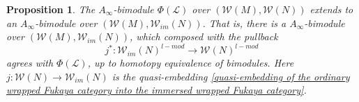 \documentclass{amsart}
\newtheorem{proposition}[theorem]{Proposition}
\numberwithin{equation}{section}
\numberwithin{figure}{section}
\begin{document}
\begin{proposition}\label{extension of the quilted Floer bimodule to Lagrangian immersions}
	The $A_{\infty}$-bimodule $\Phi(\mathcal{L})$ over $(\mathcal{W}(M), \mathcal{W}(N))$ extends to an $A_{\infty}$-bimodule over $(\mathcal{W}(M), \mathcal{W}_{im}(N))$. That is, there is a $A_{\infty}$-bimodule over $(\mathcal{W}(M), \mathcal{W}_{im}(N))$, which composed with the pullback
\begin{equation*}
j^{*}: \mathcal{W}_{im}(N)^{l-mod} \to \mathcal{W}(N)^{l-mod}
\end{equation*}
agrees with $\Phi(\mathcal{L})$, up to homotopy equivalence of bimodules. Here $j: \mathcal{W}(N) \to \mathcal{W}_{im}(N)$ is the quasi-embedding \eqref{quasi-embedding of the ordinary wrapped Fukaya category into the immersed wrapped Fukaya category}.
\end{proposition}
\end{document}
